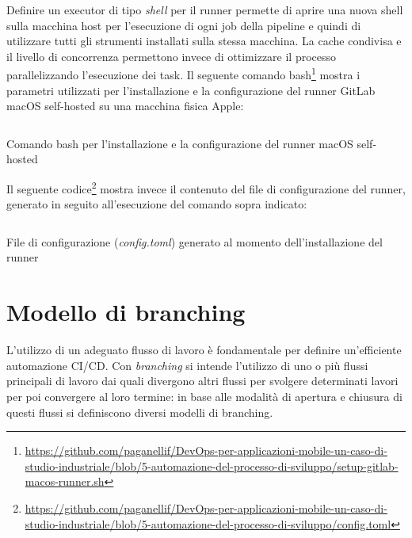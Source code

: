 Definire un executor di tipo \textit{shell} per il runner permette di aprire una nuova shell sulla macchina host per l'esecuzione di ogni job della pipeline e quindi di utilizzare tutti gli strumenti installati sulla stessa macchina.
La cache condivisa e il livello di concorrenza permettono invece di ottimizzare il processo parallelizzando l'esecuzione dei task. 
Il seguente comando bash\footnote{\href{https://github.com/paganellif/DevOps-per-applicazioni-mobile-un-caso-di-studio-industriale/blob/5-automazione-del-processo-di-sviluppo/setup-gitlab-macos-runner.sh}{https://github.com/paganellif/DevOps-per-applicazioni-mobile-un-caso-di-studio-industriale/blob/5-automazione-del-processo-di-sviluppo/setup-gitlab-macos-runner.sh}} mostra i parametri utilizzati per l'installazione e la configurazione del runner GitLab macOS self-hosted su una macchina fisica Apple:

\begin{listing}[H]
    \inputminted{bash}{code/macos-runner-setup.sh}
    \caption{Comando bash per l'installazione e la configurazione del runner macOS self-hosted}
\end{listing}

Il seguente codice\footnote{\href{https://github.com/paganellif/DevOps-per-applicazioni-mobile-un-caso-di-studio-industriale/blob/5-automazione-del-processo-di-sviluppo/config.toml}{https://github.com/paganellif/DevOps-per-applicazioni-mobile-un-caso-di-studio-industriale/blob/5-automazione-del-processo-di-sviluppo/config.toml}} mostra invece il contenuto del file di configurazione del runner,
generato in seguito all'esecuzione del comando sopra indicato:

\begin{listing}[H]
    \inputminted{toml}{code/macos-runner-config.toml}
    \caption{File di configurazione (\textit{config.toml}) generato al momento dell'installazione del runner}
\end{listing}

\section{Modello di branching}
L’utilizzo di un adeguato flusso di lavoro è fondamentale per definire un'efficiente automazione CI/CD. 
Con \textit{branching} si intende l’utilizzo di uno o più flussi principali di lavoro dai quali divergono altri flussi per svolgere determinati lavori per poi convergere al loro termine: 
in base alle modalità di apertura e chiusura di questi flussi si definiscono diversi modelli di branching.

